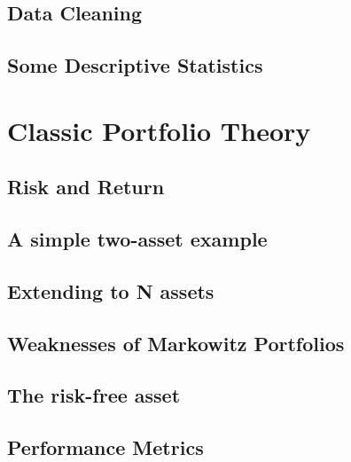 \documentclass[12pt]{article} %
\numberwithin{equation}{subsection}
\begin{document}


\subsection{Data Cleaning}




\subsection{Some Descriptive Statistics}





\section{Classic Portfolio Theory}

\subsection{Risk and Return}



\subsection{A simple two-asset example}



\subsection{Extending to N assets}




\subsection{Weaknesses of Markowitz Portfolios}




\subsection{The risk-free asset}




\subsection{Performance Metrics}
\end{document}
